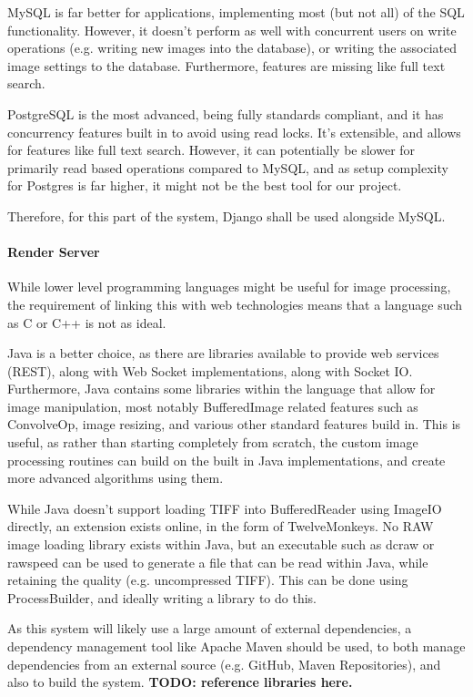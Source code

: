 \documentclass[12pt,a4paper]{article}
\begin{document}
MySQL is far better for applications, implementing most (but not all) of the SQL functionality. However,
it doesn't perform as well with concurrent users on write operations (e.g. writing new images into the database),
or writing the associated image settings to the database. Furthermore, features are missing like full text search.

 PostgreSQL is the most advanced, being fully standards compliant, and it has concurrency features built in to avoid using read locks.
 It's extensible, and allows for features like full text search. However, it can potentially be slower for primarily read based operations
 compared to MySQL, and as setup complexity for Postgres is far higher, it might not be the best tool for our project. \cite{ComparisonOfDatabaseBackends}

 Therefore, for this part of the system, Django shall be used alongside MySQL.
\paragraph{Render Server}
While lower level programming languages might be useful for image processing,
the requirement of linking this with web technologies means that a language such as C
or C++ is not as ideal.

Java is a better choice, as there are libraries available to provide web services (REST),
along with Web Socket implementations, along with Socket IO. Furthermore, Java contains
some libraries within the language that allow for image manipulation, most notably
BufferedImage related features such as ConvolveOp, image resizing, and various other standard
features build in. This is useful, as rather than starting completely from scratch, the custom
image processing routines can build on the built in Java implementations, and create more advanced
algorithms using them.

While Java doesn't support loading TIFF into BufferedReader using ImageIO directly,
an extension exists online, in the form of TwelveMonkeys. No RAW image loading library
exists within Java, but an executable such as dcraw or rawspeed can be used to generate a file
that can be read within Java, while retaining the quality (e.g. uncompressed TIFF). This can be done
using ProcessBuilder, and ideally writing a library to do this.

As this system will likely use a large amount of external dependencies, a dependency management tool
like Apache Maven should be used, to both manage dependencies from an external source (e.g. GitHub, Maven
Repositories), and also to build the system.
\textbf{TODO: reference libraries here.}
\end{document}
